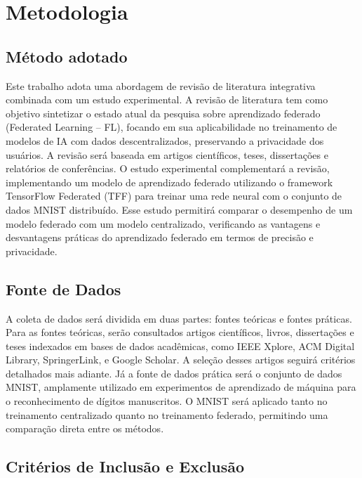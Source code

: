 \chapter[Metodologia]{Metodologia}
\label{chap:metodologia}

\section{Método adotado}

Este trabalho adota uma abordagem de revisão de literatura integrativa combinada com um estudo experimental. A revisão de literatura tem como objetivo sintetizar o estado atual da pesquisa sobre aprendizado federado (Federated Learning – FL), focando em sua aplicabilidade no treinamento de modelos de IA com dados descentralizados, preservando a privacidade dos usuários. A revisão será baseada em artigos científicos, teses, dissertações e relatórios de conferências. O estudo experimental complementará a revisão, implementando um modelo de aprendizado federado utilizando o framework TensorFlow Federated (TFF) para treinar uma rede neural com o conjunto de dados MNIST distribuído. Esse estudo permitirá comparar o desempenho de um modelo federado com um modelo centralizado, verificando as vantagens e desvantagens práticas do aprendizado federado em termos de precisão e privacidade.

\section{Fonte de Dados}

A coleta de dados será dividida em duas partes: fontes teóricas e fontes práticas. Para as fontes teóricas, serão consultados artigos científicos, livros, dissertações e teses indexados em bases de dados acadêmicas, como IEEE Xplore, ACM Digital Library, SpringerLink, e Google Scholar. A seleção desses artigos seguirá critérios detalhados mais adiante. Já a fonte de dados prática será o conjunto de dados MNIST, amplamente utilizado em experimentos de aprendizado de máquina para o reconhecimento de dígitos manuscritos. O MNIST será aplicado tanto no treinamento centralizado quanto no treinamento federado, permitindo uma comparação direta entre os métodos.

\section{Critérios de Inclusão e Exclusão}

